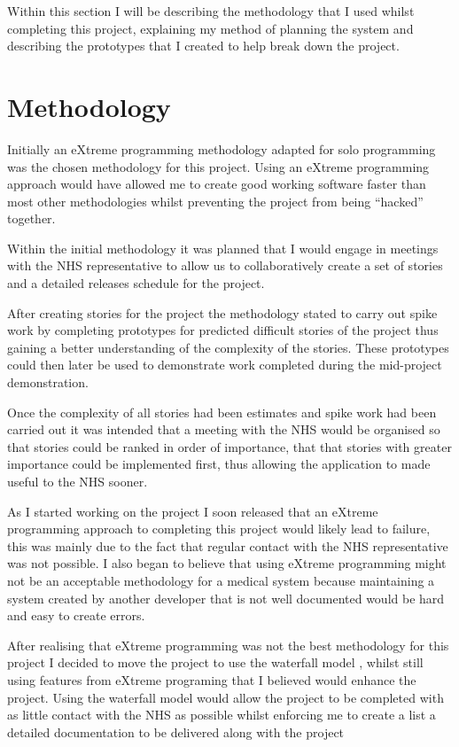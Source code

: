 Within this section I will be describing the methodology that I used whilst completing this project, explaining my method of planning the system and describing the prototypes that I created to help break down the project.

\section{Methodology}

Initially an eXtreme programming \cite{xp} methodology adapted for solo programming was the chosen methodology for this project. Using an eXtreme programming approach would have allowed me to create good working software faster than most other methodologies whilst preventing the project from being “hacked” together.

Within the initial methodology it was planned that I would engage in meetings with the NHS representative to allow us to collaboratively create a set of stories and a detailed releases schedule for the project. 

After creating stories for the project the methodology stated to carry out spike work by completing prototypes for predicted difficult stories of the project thus gaining a better understanding of the complexity of the stories. These prototypes could then later be used to demonstrate work completed during the mid-project demonstration.

Once the complexity of all stories had been estimates and spike work had been carried out it was intended that a meeting with the NHS would be organised so that stories could be ranked in order of importance, that that stories with greater importance could be implemented first, thus allowing the application to made useful to the NHS sooner.

As I started working on the project I soon released that an eXtreme programming approach to completing this project would likely lead to failure, this was mainly due to the fact that regular contact with the NHS representative was not possible.  I also began to believe that using eXtreme programming \cite{xp} might not be an acceptable methodology for a medical system because maintaining a system created by another developer that is not well documented would be hard and easy to create errors.

After realising that eXtreme programming \cite{xp} was not the best methodology for this project I decided to move the project to use the waterfall model \cite{waterfall}, whilst still using features from eXtreme programing \cite{xp} that I believed would enhance the project. Using the waterfall model \cite{waterfall} would allow the project to be completed with as little contact with the NHS as possible whilst enforcing me to create a list a detailed documentation to be delivered along with the project

